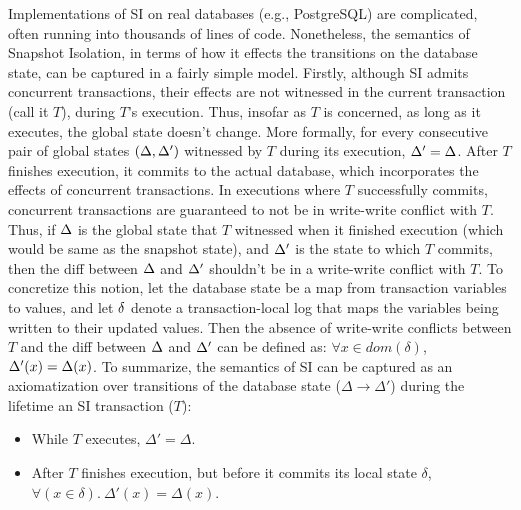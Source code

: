 Implementations of SI on real databases (e.g., PostgreSQL) are
complicated, often running into thousands of lines of code.
Nonetheless, the semantics of Snapshot Isolation, in terms of how it
effects the transitions on the database state, can be captured in a
fairly simple model. Firstly, although SI admits concurrent
transactions, their effects are  not witnessed in the current
transaction (call it $T$), during $T$'s execution. Thus, insofar as
$T$ is concerned, as long as it executes, the global state doesn't
change. More formally, for every consecutive pair of global states
$(\Delta,\Delta')$ witnessed by $T$ during its execution, $\Delta'=\Delta$.
After $T$ finishes execution, it commits to the actual database, which
incorporates the effects of concurrent transactions. In executions
where $T$ successfully commits, concurrent transactions are guaranteed
to not be in write-write conflict with $T$. Thus, if $\Delta$ is the
global state that $T$ witnessed when it finished execution (which
would be same as the snapshot state), and $\Delta'$ is the state to
which $T$ commits, then the diff between $\Delta$ and $\Delta'$ shouldn't
be in a write-write conflict with $T$. To concretize this notion, let
the database state be a map from transaction variables to values, and
let $\delta$ denote a transaction-local log that maps the variables
being written to their updated values. Then the absence of write-write
conflicts between $T$ and the diff between $\Delta$ and $\Delta'$ can be
defined as: $\forall x\in\mathit{dom}(\delta)$, $\Delta'(x) = \Delta(x)$.
To summarize, the semantics of SI can be captured as an axiomatization
over transitions of the database state ($\Delta \longrightarrow
\Delta'$) during the lifetime an SI transaction ($T$):
\begin{itemize}
  \item While $T$ executes, $\Delta' = \Delta$.
  \item After $T$ finishes execution, but before it commits its local
    state $\delta$, $\forall(x\in\delta).~\Delta'(x) = \Delta(x)$.
\end{itemize}

